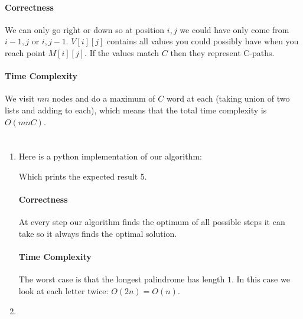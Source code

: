 \documentclass[12pt, a4paper]{article}
\begin{document}
\begin{enumerate}[a]
	\paragraph{Correctness}

	We can only go right or down so at position $i, j$ we could have only come from $i - 1, j$ or $i, j - 1$. $V[i][j]$ contains all values you could possibly have when you reach point $M[i][j]$. If the values match $C$ then they represent C-paths.

	\paragraph{Time Complexity}

	We visit $mn$ nodes and do a maximum of $C$ word at each (taking union of two lists and adding to each), which means that the total time complexity is $O(mnC)$.

\end{enumerate}

\section{} %
\begin{enumerate}[a]
	\item %
	Here is a python implementation of our algorithm:

	

	Which prints the expected result $5$.

	\paragraph{Correctness}

	At every step our algorithm finds the optimum of all possible steps it can take so it always finds the optimal solution.

	\paragraph{Time Complexity}

	The worst case is that the longest palindrome has length $1$. In this case we look at each letter twice: $O(2n) = O(n)$.

	\item %
\end{enumerate}
\end{document}
